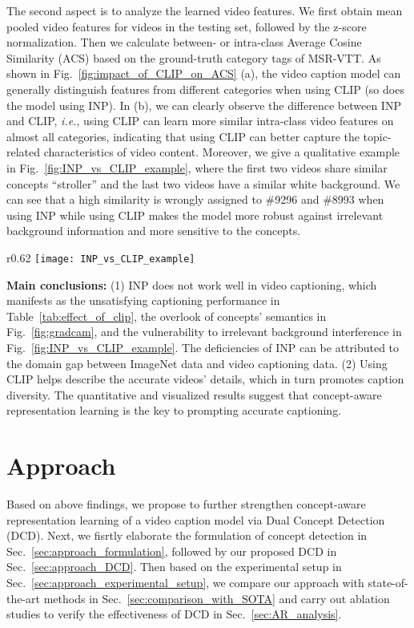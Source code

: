 \documentclass[runningheads]{llncs}
\newcommand\ie{\textit{i.e.}}
\begin{document}
The second aspect is to analyze the learned video features. We first obtain mean pooled video features for videos in the testing set, followed by the z-score normalization. Then we calculate between- or intra-class Average Cosine Similarity (ACS) based on the ground-truth category tags of MSR-VTT. As shown in Fig.~\ref{fig:impact_of_CLIP_on_ACS} (a), the video caption model can generally distinguish features from different categories when using CLIP (so does the model using INP). In (b), we can clearly observe the difference between INP and CLIP, \ie{}, using CLIP can learn more similar intra-class video features on almost all categories, indicating that using CLIP can better capture the topic-related characteristics of video content. Moreover, we give a qualitative example in Fig.~\ref{fig:INP_vs_CLIP_example}, where the first two videos share similar concepts ``stroller'' and the last two videos have a similar white background. We can see that a high similarity is wrongly assigned to \#9296 and \#8993 when using INP while using CLIP makes the model more robust against irrelevant background information and more sensitive to the concepts. 

\begin{wrapfigure}[12]{r}{0.62\linewidth}
    \vspace{-20pt}
    \centering  
    \texttt{[image: INP\_vs\_CLIP\_example]}
    \caption{An example on the learned video features. Using CLIP enables the video caption model to encode more semantics of the concepts ``stroller'' and ``TED'' rather than the background.}
    \label{fig:INP_vs_CLIP_example}
\end{wrapfigure}


\textbf{Main conclusions:} (1) INP does not work well in video captioning, which manifests as the unsatisfying captioning performance in Table~\ref{tab:effect_of_clip}, the overlook of concepts' semantics in Fig.~\ref{fig:gradcam}, and the vulnerability to irrelevant background interference in Fig.~\ref{fig:INP_vs_CLIP_example}. The deficiencies of INP can be attributed to the domain gap between ImageNet data and video captioning data. (2) Using CLIP helps describe the accurate videos' details, which in turn promotes caption diversity. The quantitative and visualized results suggest that concept-aware representation learning is the key to prompting accurate captioning.


\section{Approach}
\label{sec:AR}
Based on above findings, we propose to further strengthen concept-aware representation learning of a video caption model via Dual Concept Detection (DCD). Next, we fisrtly elaborate the formulation of concept detection in Sec.~\ref{sec:approach_formulation}, followed by our proposed DCD in Sec.~\ref{sec:approach_DCD}. 
Then based on the experimental setup in Sec.~\ref{sec:approach_experimental_setup}, we compare our approach with state-of-the-art methods in Sec.~\ref{sec:comparison_with_SOTA} and carry out ablation studies to verify the effectiveness of DCD in Sec.~\ref{sec:AR_analysis}.
\end{document}
